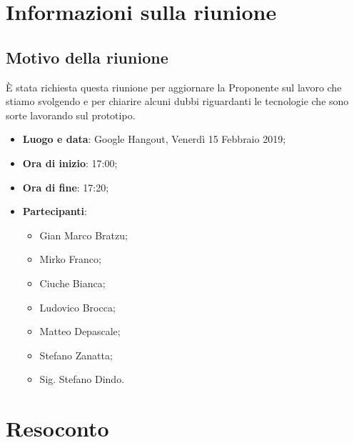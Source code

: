 \documentclass[a4paper,12pt]{article}
\begin{document}
	\tableofcontents
	\cleardoublepage
	\section{Informazioni sulla riunione}
	\subsection{Motivo della riunione}\`{E} stata richiesta questa riunione per aggiornare la Proponente sul lavoro che stiamo svolgendo e per chiarire alcuni dubbi riguardanti le tecnologie che sono sorte lavorando sul prototipo.
	
	\begin{itemize}
		\item \textbf{Luogo e data}: Google Hangout, Venerdì 15 Febbraio 2019;
		\item \textbf{Ora di inizio}: 17:00;
		\item \textbf{Ora di fine}: 17:20;
		\item \textbf{Partecipanti}:  
		\begin{itemize}
			\item Gian Marco Bratzu;
			\item Mirko Franco;
			\item Ciuche Bianca;
			\item Ludovico Brocca;
			\item Matteo Depascale;
			\item Stefano Zanatta;
			\item Sig. Stefano Dindo.
		\end{itemize}
	\end{itemize}
	
	
	\section{Resoconto}
\end{document}
